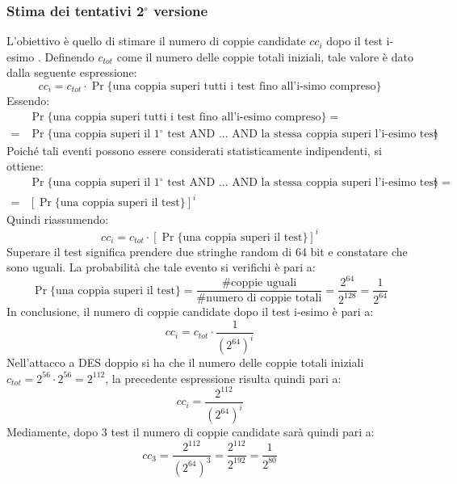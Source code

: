 \subsubsection{Stima dei tentativi 2$^{\circ}$ versione}
L'obiettivo è quello di stimare il numero di coppie candidate $cc_i$ dopo il test i-esimo . Definendo $c_{tot}$ come il numero delle coppie totali iniziali, tale valore è dato dalla seguente espressione:
\[
cc_{i} = c_{tot} \cdot \Pr\{\text{una coppia superi tutti i test fino all'i-simo compreso}\} 
\]
Essendo:
\[
\begin{split}
&\Pr\{\text{una coppia superi tutti i test fino all'i-esimo compreso}\} = \\  = &\Pr\{\text{una coppia superi il 1$^{\circ}$ test AND ... AND la stessa coppia superi l'i-esimo test}\}
\end{split}
\]
Poiché tali eventi possono essere considerati statisticamente indipendenti, si ottiene:
\[
\begin{split}
&\Pr\{\text{una coppia superi il 1$^{\circ}$ test AND ... AND la stessa coppia superi l'i-esimo test}\} = \\
= &[\Pr\{\text{una coppia superi il test}\}]^{i}
\end{split}
\]
Quindi riassumendo:
\[
cc_{i} = c_{tot} \cdot [\Pr\{\text{una coppia superi il test}\}]^{i}
\]
Superare il test significa prendere due stringhe random di 64 bit e constatare che sono uguali. La probabilità che tale evento si verifichi è pari a:
\[
\Pr\{\text{una coppia superi il test}\} = \frac{\text{\#coppie uguali}}{\text{\#numero di coppie totali}} = \frac{2^{64}}{2^{128}} = \frac{1}{2^{64}}
\]
In conclusione, il numero di coppie candidate dopo il test i-esimo è pari a:
\[
cc_{i} = c_{tot} \cdot \frac{1}{(2^{64})^{i}}
\]
Nell'attacco a DES doppio si ha che il numero delle coppie totali iniziali $c_{tot} = 2^{56} \cdot 2^{56} = 2^{112}$, la precedente espressione risulta quindi pari a:
\[
cc_{i} =\frac{2^{112}}{(2^{64})^{i}}
\]
Mediamente, dopo 3 test il numero di coppie candidate sarà quindi pari a:
\[
cc_{3} =\frac{2^{112}}{(2^{64})^{3}} = \frac{2^{112}}{2^{192}} = \frac{1}{2^{80}}
\]




